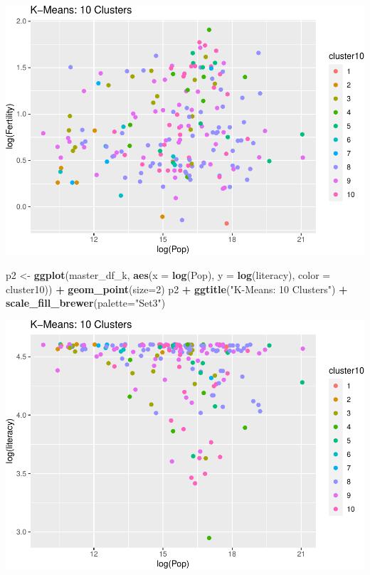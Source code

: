 \documentclass[]{article}
\newenvironment{Shaded}{\begin{snugshade}}{\end{snugshade}}
\newcommand{\DataTypeTok}[1]{\textcolor[rgb]{0.13,0.29,0.53}{#1}}
\newcommand{\DecValTok}[1]{\textcolor[rgb]{0.00,0.00,0.81}{#1}}
\newcommand{\KeywordTok}[1]{\textcolor[rgb]{0.13,0.29,0.53}{\textbf{#1}}}
\newcommand{\NormalTok}[1]{#1}
\newcommand{\OperatorTok}[1]{\textcolor[rgb]{0.81,0.36,0.00}{\textbf{#1}}}
\newcommand{\StringTok}[1]{\textcolor[rgb]{0.31,0.60,0.02}{#1}}
\begin{document}
\includegraphics{eda_files/figure-latex/unnamed-chunk-30-7.pdf}

\begin{Shaded}
\begin{Highlighting}[]
\NormalTok{p2 <-}\StringTok{ }\KeywordTok{ggplot}\NormalTok{(master_df_k, }\KeywordTok{aes}\NormalTok{(}\DataTypeTok{x =} \KeywordTok{log}\NormalTok{(Pop), }\DataTypeTok{y =} \KeywordTok{log}\NormalTok{(literacy), }\DataTypeTok{color =}\NormalTok{ cluster10)) }\OperatorTok{+}
\StringTok{  }\KeywordTok{geom_point}\NormalTok{(}\DataTypeTok{size=}\DecValTok{2}\NormalTok{)}
\NormalTok{p2 }\OperatorTok{+}\StringTok{ }\KeywordTok{ggtitle}\NormalTok{(}\StringTok{"K-Means: 10 Clusters"}\NormalTok{) }\OperatorTok{+}\StringTok{ }\KeywordTok{scale_fill_brewer}\NormalTok{(}\DataTypeTok{palette=}\StringTok{"Set3"}\NormalTok{)}
\end{Highlighting}
\end{Shaded}

\includegraphics{eda_files/figure-latex/unnamed-chunk-30-8.pdf}
\end{document}
